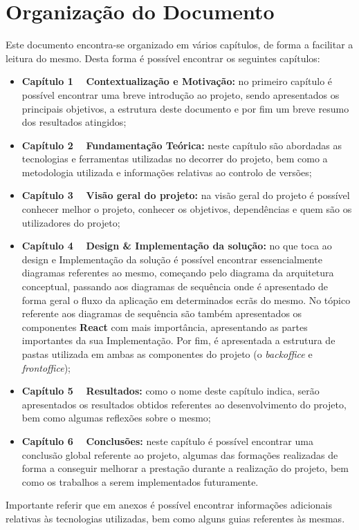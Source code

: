 \section{Organização do Documento}

Este documento encontra-se organizado em vários capítulos, de forma a facilitar a leitura do mesmo. Desta forma é possível encontrar os seguintes capítulos:

\begin{itemize}
	\item \textbf{Capítulo 1 \textemdash~ Contextualização e Motivação:} no primeiro capítulo é possível encontrar uma breve introdução ao projeto, sendo apresentados os principais objetivos, a estrutura deste documento e por fim um breve resumo dos resultados atingidos;

	\item \textbf{Capítulo 2 \textemdash~ Fundamentação Teórica:} neste capítulo são abordadas as tecnologias e ferramentas utilizadas no decorrer do projeto, bem como a metodologia utilizada e informações relativas ao controlo de versões;

	\item \textbf{Capítulo 3 \textemdash~ Visão geral do projeto:} na visão geral do projeto é possível conhecer melhor o projeto, conhecer os objetivos, dependências e quem são os utilizadores do projeto;

	\item \textbf{Capítulo 4 \textemdash~ Design \& Implementação da solução:} no que toca ao design e Implementação da solução é possível encontrar essencialmente diagramas referentes ao mesmo, começando pelo diagrama da arquitetura conceptual, passando aos diagramas de sequência onde é apresentado de forma geral o fluxo da aplicação em determinados ecrãs do mesmo. No tópico referente aos diagramas de sequência são também apresentados os componentes \textbf{React} com mais importância, apresentando as partes importantes da sua Implementação. Por fim, é apresentada a estrutura de pastas utilizada em ambas as componentes do projeto (o \textit{backoffice} e \textit{frontoffice});

	\item \textbf{Capítulo 5 \textemdash~ Resultados:} como o nome deste capítulo indica, serão apresentados os resultados obtidos referentes ao desenvolvimento do projeto, bem como algumas reflexões sobre o mesmo;

	\item  \textbf{Capítulo 6 \textemdash~ Conclusões:} neste capítulo é possível encontrar uma conclusão global referente ao projeto, algumas das formações realizadas de forma a conseguir melhorar a prestação durante a realização do projeto, bem como os trabalhos a serem implementados futuramente.
\end{itemize}

Importante referir que em anexos é possível encontrar informações adicionais relativas às tecnologias utilizadas, bem como alguns guias referentes às mesmas.